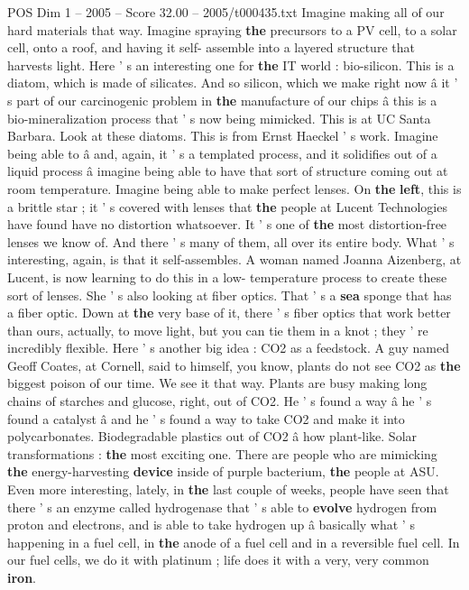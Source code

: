 \begin{textsample}{POS Dim 1 – 2005 – Score 32.00 – 2005/t000435.txt}
Imagine making all of our hard materials that way.
Imagine spraying \textbf{the} precursors to a PV cell, to a solar cell, onto a roof, and having it self- assemble into a layered structure that harvests light.
Here ' s an interesting one for \textbf{the} IT world : bio-silicon.
This is a diatom, which is made of silicates.
And so silicon, which we make right now â it ' s part of our carcinogenic problem in \textbf{the} manufacture of our chips â this is a bio-mineralization process that ' s now being mimicked.
This is at UC Santa Barbara.
Look at these diatoms.
This is from Ernst Haeckel ' s work.
Imagine being able to â and, again, it ' s a templated process, and it solidifies out of a liquid process â imagine being able to have that sort of structure coming out at room temperature.
Imagine being able to make perfect lenses.
On \textbf{the} \textbf{left}, this is a brittle star ; it ' s covered with lenses that \textbf{the} people at Lucent Technologies have found have no distortion whatsoever.
It ' s one of \textbf{the} most distortion-free lenses we know of.
And there ' s many of them, all over its entire body.
What ' s interesting, again, is that it self-assembles.
A woman named Joanna Aizenberg, at Lucent, is now learning to do this in a low- temperature process to create these sort of lenses.
She ' s also looking at fiber optics.
That ' s a \textbf{sea} sponge that has a fiber optic.
Down at \textbf{the} very base of it, there ' s fiber optics that work better than ours, actually, to move light, but you can tie them in a knot ; they ' re incredibly flexible.
Here ' s another big idea : CO2 as a feedstock.
A guy named Geoff Coates, at Cornell, said to himself, you know, plants do not see CO2 as \textbf{the} biggest poison of our time.
We see it that way.
Plants are busy making long chains of starches and glucose, right, out of CO2.
He ' s found a way â he ' s found a catalyst â and he ' s found a way to take CO2 and make it into polycarbonates.
Biodegradable plastics out of CO2 â how plant-like.
Solar transformations : \textbf{the} most exciting one.
There are people who are mimicking \textbf{the} energy-harvesting \textbf{device} inside of purple bacterium, \textbf{the} people at ASU.
Even more interesting, lately, in \textbf{the} last couple of weeks, people have seen that there ' s an enzyme called hydrogenase that ' s able to \textbf{evolve} hydrogen from proton and electrons, and is able to take hydrogen up â basically what ' s happening in a fuel cell, in \textbf{the} anode of a fuel cell and in a reversible fuel cell.
In our fuel cells, we do it with platinum ; life does it with a very, very common \textbf{iron}.

\end{textsample}
